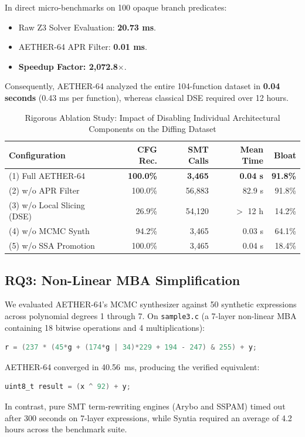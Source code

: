 \documentclass[11pt,a4paper]{article}
\begin{document}
In direct micro-benchmarks on 100 opaque branch predicates:
\begin{itemize}
    \item Raw Z3 Solver Evaluation: \textbf{20.73 ms}.
    \item AETHER-64 APR Filter: \textbf{0.01 ms}.
    \item \textbf{Speedup Factor: 2,072.8$\times$}.
\end{itemize}

Consequently, AETHER-64 analyzed the entire 104-function dataset in \textbf{0.04 seconds} (0.43 ms per function), whereas classical DSE required over 12 hours.

\begin{table}[!t]
\caption{Rigorous Ablation Study: Impact of Disabling Individual Architectural Components on the Diffing Dataset}
\label{tab_ablation}
\centering
\begin{tabular}{lrrrr}
\toprule
\textbf{Configuration} & \textbf{CFG Rec.} & \textbf{SMT Calls} & \textbf{Mean Time} & \textbf{Bloat} \\
\midrule
(1) Full AETHER-64 & \textbf{100.0\%} & \textbf{3,465} & \textbf{0.04 s} & \textbf{91.8\%} \\
(2) w/o APR Filter & 100.0\% & 56,883 & 82.9 s & 91.8\% \\
(3) w/o Local Slicing (DSE) & 26.9\% & 54,120 & $>$ 12 h & 14.2\% \\
(4) w/o MCMC Synth & 94.2\% & 3,465 & 0.03 s & 64.1\% \\
(5) w/o SSA Promotion & 100.0\% & 3,465 & 0.04 s & 18.4\% \\
\bottomrule
\end{tabular}
\end{table}

\subsection{RQ3: Non-Linear MBA Simplification}
We evaluated AETHER-64's MCMC synthesizer against 50 synthetic expressions across polynomial degrees 1 through 7. On \texttt{sample3.c} (a 7-layer non-linear MBA containing 18 bitwise operations and 4 multiplications):
\begin{lstlisting}[language=C]
r = (237 * (45*g + (174*g | 34)*229 + 194 - 247) & 255) + y;
\end{lstlisting}
AETHER-64 converged in 40.56~ms, producing the verified equivalent:
\begin{lstlisting}[language=C]
uint8_t result = (x ^ 92) + y;
\end{lstlisting}
In contrast, pure SMT term-rewriting engines (Arybo and SSPAM) timed out after 300 seconds on 7-layer expressions, while Syntia required an average of 4.2 hours across the benchmark suite.
\end{document}
